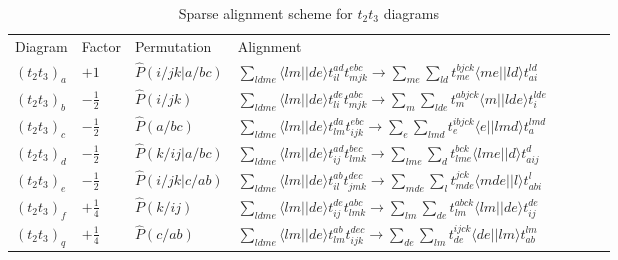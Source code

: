 \begin{table}[]
\centering
\caption{Sparse alignment scheme for $t_2 t_3$ diagrams}
\label{tab:sparse_alignments_t2t3}
\begin{tabular}{llllllll}
Diagram & Factor & Permutation & Alignment  \\
$(t_2 t_3)_a $&$+1$&$\hat{P}(i/jk \vert a/bc)$&$  \sum_{ldme} \langle l m \vert \vert d e \rangle t^{a d}_{i l}t^{e b c}_{m j k}  \rightarrow  \sum_{me} \sum_{ld} t^{bjck}_{me} \langle me\vert \vert ld\rangle t^{ld}_{ai} $ \\
$(t_2 t_3)_b $&$-\frac{1}{2}$&$\hat{P}(i/jk)$&$  \sum_{ldme} \langle l m \vert \vert d e \rangle t^{d e}_{l i}t^{a b c}_{m j k}  \rightarrow  \sum_{m} \sum_{lde} t^{abjck}_{m} \langle m\vert \vert lde\rangle t^{lde}_{i} $ \\
$(t_2 t_3)_c $&$-\frac{1}{2}$&$\hat{P}(a/bc)$&$  \sum_{ldme} \langle l m \vert \vert d e \rangle t^{d a}_{l m}t^{e b c}_{i j k}  \rightarrow  \sum_{e} \sum_{lmd} t^{ibjck}_{e} \langle e\vert \vert lmd\rangle t^{lmd}_{a} $\\
$(t_2 t_3)_d $&$-\frac{1}{2}$&$\hat{P}(k/ij \vert a/bc)$&$  \sum_{ldme} \langle l m \vert \vert d e \rangle t^{a d}_{i j}t^{b e c}_{l m k}  \rightarrow  \sum_{lme} \sum_{d} t^{bck}_{lme} \langle lme\vert \vert d\rangle t^{d}_{aij} $ \\
$(t_2 t_3)_e $&$-\frac{1}{2}$&$\hat{P}(i/jk \vert c/ab)$&$  \sum_{ldme} \langle l m \vert \vert d e \rangle t^{a b}_{i l}t^{d e c}_{j m k}  \rightarrow  \sum_{mde} \sum_{l} t^{jck}_{mde} \langle mde\vert \vert l\rangle t^{l}_{abi} $ \\
$(t_2 t_3)_f $&$+\frac{1}{4}$&$\hat{P}(k/ij)$&$  \sum_{ldme} \langle l m \vert \vert d e \rangle t^{d e}_{i j}t^{a b c}_{l m k}  \rightarrow  \sum_{lm} \sum_{de} t^{abck}_{lm} \langle lm\vert \vert de\rangle t^{de}_{ij} $ \\
$(t_2 t_3)_q $&$+\frac{1}{4}$&$\hat{P}(c/ab)$&$  \sum_{ldme} \langle l m \vert \vert d e \rangle t^{a b}_{l m}t^{d e c}_{i j k}  \rightarrow  \sum_{de} \sum_{lm} t^{ijck}_{de} \langle de\vert \vert lm\rangle t^{lm}_{ab} $ \\
\end{tabular}
\end{table}

